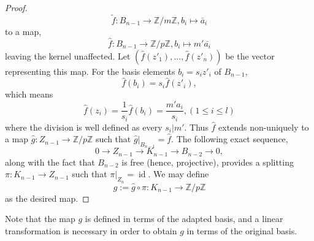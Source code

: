 \documentclass[11pt]{book}
\theoremstyle{Rem}
\theoremstyle{definition}
\numberwithin{equation}{section}
\newcommand\id{\operatorname{id}}
\newcommand\ZZ{\mathbb Z}
\begin{document}
\begin{proof}
\begin{equation}
	 	\tilde{f}: B_{n-1} \rightarrow \ZZ/m\ZZ, b_i\mapsto  \bar{a}_i 	
 \end{equation}
 to a map,
 \begin{equation}
 	\hat{f}: B_{n-1} \rightarrow \ZZ/p\ZZ, b_i\mapsto  m'\bar{a_i}
 \end{equation}
leaving the kernel unaffected.  Let $(\hat{f}(z'_1), ..., \hat{f}(z'_n))$ be the vector representing this map.  For the basis elements $b_i = s_iz'_i$ of $B_{n-1}$,
\begin{equation}
	 \hat{f}(b_i)= s_i\hat{f}(z'_i),
\end{equation}
which means \begin{equation}
	\hat{f}(z_i) = \frac{1}{s_i}\hat{f}(b_i) = \frac{m' a_i}{ s_i} ,(1\leq i\leq l)
\end{equation}
where the division is well defined as every $s_i|m'$. Thus $\hat{f}$ extends non-uniquely to a map $\hat{g}:Z_{n-1}\rightarrow \ZZ/p\ZZ$ such that $\hat{g}|_{B_{n-1}} = \hat{f}$. The following exact sequence,
\begin{equation}
	0\rightarrow Z_{n-1}\rightarrow K_{n-1} \rightarrow B_{n-2} \rightarrow 0,
\end{equation}
along with the fact that $B_{n-2}$ is free (hence, projective), provides a splitting $\pi:K_{n-1} \rightarrow Z_{n-1}$ such that $\pi|_{Z_n}=\id$. We may define \begin{equation}
	g:= \hat{g}\circ \pi: K_{n-1} \rightarrow \ZZ/p\ZZ   
\end{equation}
as the desired map.\end{proof}
Note that the map $g$ is defined in terms of the adapted basis, and a linear transformation is necessary in order to obtain $g$ in terms of the original basis.
\end{document}
